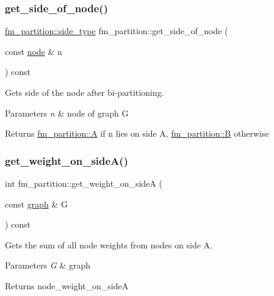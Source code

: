 \subsubsection{\texorpdfstring{get\+\_\+side\+\_\+of\+\_\+node()}{get\_side\_of\_node()}}
{\footnotesize\ttfamily \mbox{\hyperlink{classfm__partition_a7cdff1bea3740a287387e8408e16ca79}{fm\+\_\+partition\+::side\+\_\+type}} fm\+\_\+partition\+::get\+\_\+side\+\_\+of\+\_\+node (\begin{DoxyParamCaption}\item[{const \mbox{\hyperlink{classnode}{node}} \&}]{n }\end{DoxyParamCaption}) const}

Gets side of the node after bi-\/partitioning.


\begin{DoxyParams}{Parameters}
{\em n} & node of graph {\ttfamily G} \\
\hline
\end{DoxyParams}
\begin{DoxyReturn}{Returns}
{\ttfamily \mbox{\hyperlink{classfm__partition_a973d30e9eb0d21f659ef288176cd4791}{fm\+\_\+partition\+::A}}} if {\ttfamily n} lies on side {\ttfamily A}, {\ttfamily \mbox{\hyperlink{classfm__partition_a42515c44eecb7ba3e2ec549a877ef238}{fm\+\_\+partition\+::B}}} otherwise 
\end{DoxyReturn}
\mbox{\label{classfm__partition_a3f1ddcff1ba7a4c4090f947f918b5331}} 
\subsubsection{\texorpdfstring{get\+\_\+weight\+\_\+on\+\_\+side\+A()}{get\_weight\_on\_sideA()}}
{\footnotesize\ttfamily int fm\+\_\+partition\+::get\+\_\+weight\+\_\+on\+\_\+sideA (\begin{DoxyParamCaption}\item[{const \mbox{\hyperlink{classgraph}{graph}} \&}]{G }\end{DoxyParamCaption}) const}

Gets the sum of all node weights from nodes on side A.


\begin{DoxyParams}{Parameters}
{\em G} & graph \\
\hline
\end{DoxyParams}
\begin{DoxyReturn}{Returns}
{\ttfamily node\+\_\+weight\+\_\+on\+\_\+sideA} 
\end{DoxyReturn}
\mbox{\label{classfm__partition_a9e380da1dc654fcffdf4ac2418c6ef80}} 
